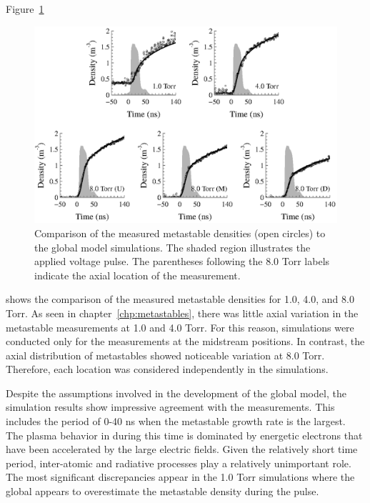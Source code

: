 Figure~\ref{fig:nmcomp}
\begin{figure}
  \centering
  \includegraphics{./chapters/modeling/figures/nmcomp.eps}
  \caption{Comparison of the measured metastable densities (open circles) to
    the global model simulations. The shaded region illustrates the applied
    voltage pulse. The parentheses following the 8.0 Torr labels indicate the
    axial location of the measurement.}
  \label{fig:nmcomp}
\end{figure}
shows the comparison of the measured metastable densities for 1.0, 4.0, and 8.0
Torr. As seen in chapter~\ref{chp:metastables}, there was little axial variation
in the metastable measurements at 1.0 and 4.0 Torr. For this reason, simulations
were conducted only for the measurements at the midstream positions. In
contrast, the axial distribution of metastables showed noticeable variation at
8.0 Torr. Therefore, each location was considered independently in the
simulations.

Despite the assumptions involved in the development of the global model, the
simulation results show impressive agreement with the measurements. This
includes the period of 0-40 ns when the metastable growth rate is the largest.
The plasma behavior in during this time is dominated by energetic electrons that
have been accelerated by the large electric fields. Given the relatively short
time period, inter-atomic and radiative processes play a relatively unimportant
role. The most significant discrepancies appear in the 1.0 Torr simulations
where the global appears to overestimate the metastable density during the
pulse.

